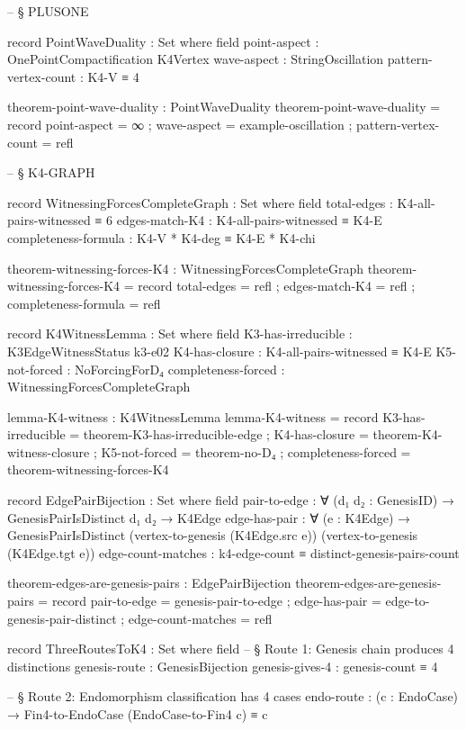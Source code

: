 \documentclass[11pt,a4paper]{book}
\begin{document}
\begin{code}
-- § PLUSONE

record PointWaveDuality : Set where
  field
    point-aspect : OnePointCompactification K4Vertex
    wave-aspect : StringOscillation
    pattern-vertex-count : K4-V ≡ 4

theorem-point-wave-duality : PointWaveDuality
theorem-point-wave-duality = record
  { point-aspect = ∞
  ; wave-aspect = example-oscillation
  ; pattern-vertex-count = refl
  }


-- § K4-GRAPH

record WitnessingForcesCompleteGraph : Set where
  field
    total-edges : K4-all-pairs-witnessed ≡ 6
    edges-match-K4 : K4-all-pairs-witnessed ≡ K4-E
    completeness-formula : K4-V * K4-deg ≡ K4-E * K4-chi

theorem-witnessing-forces-K4 : WitnessingForcesCompleteGraph
theorem-witnessing-forces-K4 = record
  { total-edges = refl
  ; edges-match-K4 = refl
  ; completeness-formula = refl
  }

record K4WitnessLemma : Set where
  field
    K3-has-irreducible   : K3EdgeWitnessStatus k3-e02
    K4-has-closure       : K4-all-pairs-witnessed ≡ K4-E
    K5-not-forced        : NoForcingForD₄
    completeness-forced  : WitnessingForcesCompleteGraph

lemma-K4-witness : K4WitnessLemma
lemma-K4-witness = record
  { K3-has-irreducible  = theorem-K3-has-irreducible-edge
  ; K4-has-closure      = theorem-K4-witness-closure
  ; K5-not-forced       = theorem-no-D₄
  ; completeness-forced = theorem-witnessing-forces-K4
  }

record EdgePairBijection : Set where
  field
    pair-to-edge : ∀ (d₁ d₂ : GenesisID) → GenesisPairIsDistinct d₁ d₂ → K4Edge
    edge-has-pair : ∀ (e : K4Edge) → 
      GenesisPairIsDistinct (vertex-to-genesis (K4Edge.src e)) (vertex-to-genesis (K4Edge.tgt e))
    edge-count-matches : k4-edge-count ≡ distinct-genesis-pairs-count

theorem-edges-are-genesis-pairs : EdgePairBijection
theorem-edges-are-genesis-pairs = record
  { pair-to-edge = genesis-pair-to-edge
  ; edge-has-pair = edge-to-genesis-pair-distinct
  ; edge-count-matches = refl
  }

record ThreeRoutesToK4 : Set where
  field
    -- § Route 1: Genesis chain produces 4 distinctions
    genesis-route       : GenesisBijection
    genesis-gives-4     : genesis-count ≡ 4

    -- § Route 2: Endomorphism classification has 4 cases
    endo-route          : (c : EndoCase) → Fin4-to-EndoCase (EndoCase-to-Fin4 c) ≡ c


\end{code}
\end{document}
